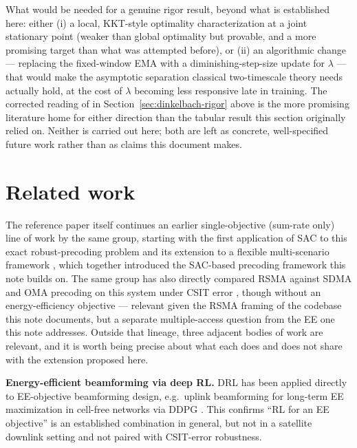 \documentclass[11pt]{article}
\begin{document}
What would be needed for a genuine rigor result, beyond what is established
here: either (i) a local, KKT-style optimality characterization at a joint
stationary point (weaker than global optimality but provable, and a more
promising target than what was attempted before), or (ii) an algorithmic
change --- replacing the fixed-window EMA with a diminishing-step-size
update for $\lambda$ --- that would make the asymptotic separation classical
two-timescale theory needs actually hold, at the cost of $\lambda$ becoming
less responsive late in training. The corrected reading of
\cite{Paternain2019,DingZhangBasar2020} in
Section~\ref{sec:dinkelbach-rigor} above is the more promising literature
home for either direction than the tabular result this section originally
relied on. Neither is carried out here; both are left as concrete,
well-specified future work rather than as claims this document makes.

\section{Related work}
\label{sec:related}

The reference paper \cite{Schroder2025} itself continues an earlier
single-objective (sum-rate only) line of work by the same group, starting
with the first application of SAC to this exact robust-precoding problem
\cite{GraclaICASSP2023} and its extension to a flexible multi-scenario
framework \cite{Gracla2024}, which together introduced the SAC-based
precoding framework this note builds on. The same group has also directly
compared RSMA against SDMA and OMA precoding on this system under CSIT
error \cite{SchroderRSMA2023}, though without an energy-efficiency
objective --- relevant given the RSMA framing of the codebase this note
documents, but a separate multiple-access question from the EE one this
note addresses. Outside that lineage, three adjacent bodies of work are
relevant, and it is worth being precise about what each does and does not
share with the extension proposed here.

\textbf{Energy-efficient beamforming via deep RL.} DRL has been applied
directly to EE-objective beamforming design, e.g.\ uplink beamforming for
long-term EE maximization in cell-free networks via DDPG
\cite{LiNiTianHua2021}. This confirms ``RL for an EE objective'' is an
established combination in general, but not in a satellite downlink setting
and not paired with CSIT-error robustness.
\end{document}
